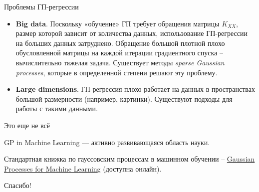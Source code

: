 \documentclass[fullscreen=true, bookmarks=true, hyperref={pdfencoding=unicode}]{beamer}
\begin{document}
\begin{frame}{Проблемы ГП-регрессии}

\begin{itemize}
    \item<1-> \textbf{Big data}. Поскольку «обучение» ГП требует обращения матрицы $K_{XX}$, размер которой зависит от количества данных, использование ГП-регрессии на больших данных затруднено. Обращение большой плотной плохо обусловленной матрицы на каждой итерации градиентного спуска -- вычислительно тяжелая задача. Существует методы \textit{sparse Gaussian processes}, которые в определенной степени решают эту проблему.
    \item<2-> \textbf{Large dimensions}. ГП-регрессия плохо работает на данных в пространствах большой размерности (например, картинки). Существуют подходы для работы с такими данными.
\end{itemize}

\end{frame}

\begin{frame}{Это еще не всё}

GP in Machine Learning --- активно развивающаяся область науки.

Стандартная книжка по гауссовским процессам в машинном обучении -- \href{http://www.gaussianprocess.org/gpml/chapters/RW.pdf}{Gaussian Processes for Machine Learning} (доступна онлайн).

\end{frame}

\begin{frame}{}

    \centerline{Спасибо!}

\end{frame}
\end{document}
